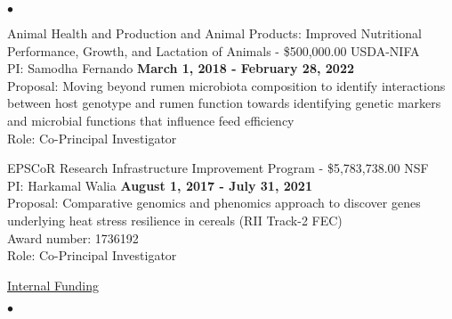 \documentclass[margin,line,10pt]{res}
\newenvironment{list2}{
  \begin{list}{$\bullet$}{%
      \setlength{\itemsep}{0in}
      \setlength{\parsep}{0in} \setlength{\parskip}{0in}
      \setlength{\topsep}{0in} \setlength{\partopsep}{0in} 
      \setlength{\leftmargin}{0.2in}}}{\end{list}}
\begin{document}
\begin{resume}
\begin{list2}
\vspace{0.5cm}

\item Animal Health and Production and Animal Products: Improved Nutritional Performance, Growth, and Lactation of Animals  - \$500,000.00  \hfill USDA-NIFA\\
PI: Samodha Fernando   \hfill \textbf{March 1, 2018 - February 28, 2022}\\
Proposal: Moving beyond rumen microbiota composition to identify interactions between host genotype and rumen function towards identifying genetic markers and microbial functions that influence feed efficiency  \\
Role: Co-Principal Investigator \\

\vspace{0.5cm}


\vspace{0.5cm}
  
\item EPSCoR Research Infrastructure Improvement Program - \$5,783,738.00   \hfill NSF \\
PI: Harkamal Walia   \hfill \textbf{August 1, 2017 - July 31, 2021}\\
Proposal:  Comparative genomics and phenomics approach to discover genes underlying heat stress resilience in cereals  (RII Track-2 FEC)  \\
Award number: 1736192 \\
Role: Co-Principal Investigator \\

\end{list2}




\begin{flushleft}
\hspace{0.2cm} \underline{Internal Funding}
\end{flushleft}
\begin{list2}



\end{list2}
\end{resume}
\end{document}
